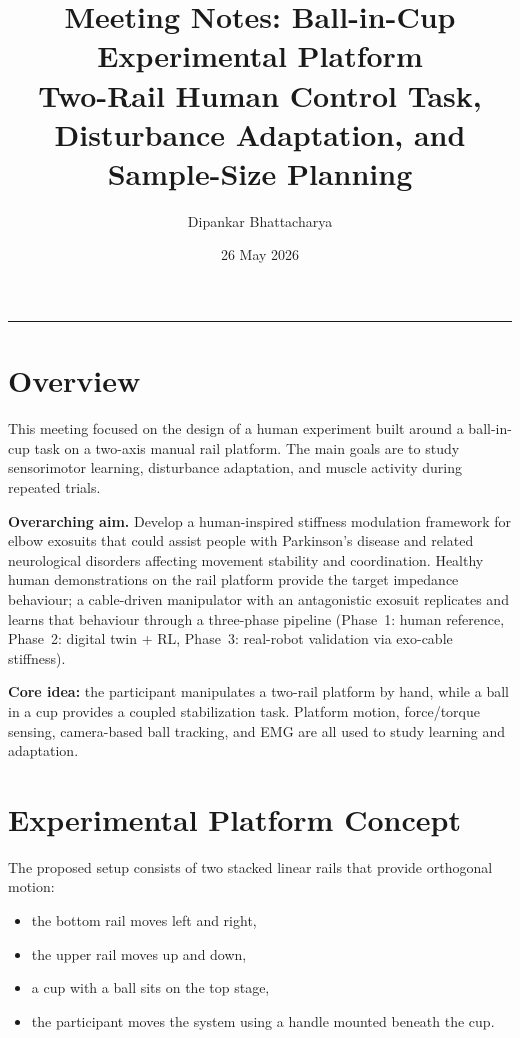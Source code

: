 \documentclass[11pt, a4paper]{article}
\title{\textbf{Meeting Notes: Ball-in-Cup Experimental Platform}\\[4pt]
       \large Two-Rail Human Control Task, Disturbance Adaptation, and Sample-Size Planning}
\author{Dipankar Bhattacharya}
\date{26 May 2026}
\begin{document}
\maketitle
\tableofcontents
\vspace{0.5cm}
\hrule
\vspace{0.4cm}

\section{Overview}

This meeting focused on the design of a human experiment built around a ball-in-cup task on a two-axis manual rail platform. The main goals are to study sensorimotor learning, disturbance adaptation, and muscle activity during repeated trials.

\begin{infobox}
\textbf{Overarching aim.} Develop a human-inspired stiffness modulation framework for elbow exosuits that could assist people with Parkinson's disease and related neurological disorders affecting movement stability and coordination. Healthy human demonstrations on the rail platform provide the target impedance behaviour; a cable-driven manipulator with an antagonistic exosuit replicates and learns that behaviour through a three-phase pipeline (Phase~1: human reference, Phase~2: digital twin + RL, Phase~3: real-robot validation via exo-cable stiffness).
\end{infobox}

\begin{infobox}
\textbf{Core idea:} the participant manipulates a two-rail platform by hand, while a ball in a cup provides a coupled stabilization task. Platform motion, force/torque sensing, camera-based ball tracking, and EMG are all used to study learning and adaptation.
\end{infobox}

\section{Experimental Platform Concept}

The proposed setup consists of two stacked linear rails that provide orthogonal motion:

\begin{itemize}[nosep]
  \item the bottom rail moves left and right,
  \item the upper rail moves up and down,
  \item a cup with a ball sits on the top stage,
  \item the participant moves the system using a handle mounted beneath the cup.
\end{itemize}
\end{document}
